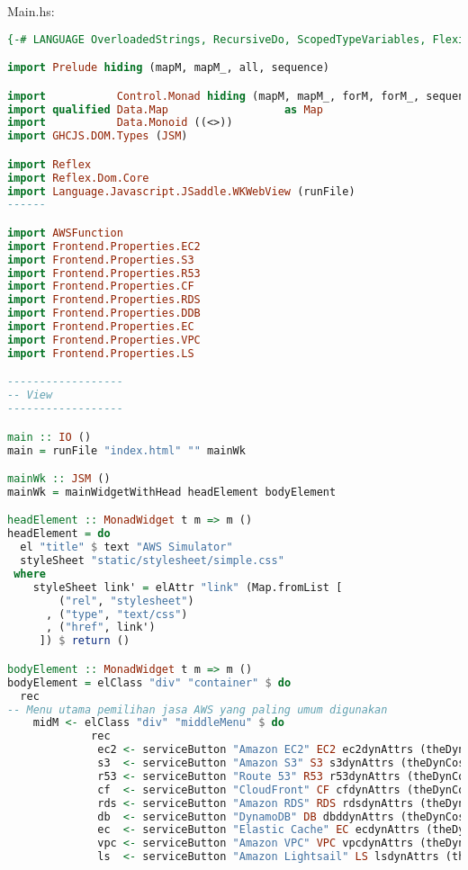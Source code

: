 \documentclass[pi.tex]{subfile}
\begin{document}
Main.hs:
\begin{lstlisting}[language=Haskell]
{-# LANGUAGE OverloadedStrings, RecursiveDo, ScopedTypeVariables, FlexibleContexts, TypeFamilies, ConstraintKinds #-}

import Prelude hiding (mapM, mapM_, all, sequence)

import           Control.Monad hiding (mapM, mapM_, forM, forM_, sequence)
import qualified Data.Map                  as Map
import           Data.Monoid ((<>))
import GHCJS.DOM.Types (JSM)

import Reflex
import Reflex.Dom.Core
import Language.Javascript.JSaddle.WKWebView (runFile)
------

import AWSFunction
import Frontend.Properties.EC2
import Frontend.Properties.S3
import Frontend.Properties.R53
import Frontend.Properties.CF
import Frontend.Properties.RDS
import Frontend.Properties.DDB
import Frontend.Properties.EC
import Frontend.Properties.VPC
import Frontend.Properties.LS

------------------
-- View
------------------

main :: IO ()
main = runFile "index.html" "" mainWk

mainWk :: JSM ()
mainWk = mainWidgetWithHead headElement bodyElement

headElement :: MonadWidget t m => m ()
headElement = do
  el "title" $ text "AWS Simulator"
  styleSheet "static/stylesheet/simple.css"
 where
    styleSheet link' = elAttr "link" (Map.fromList [
        ("rel", "stylesheet")
      , ("type", "text/css")
      , ("href", link')
     ]) $ return ()

bodyElement :: MonadWidget t m => m ()
bodyElement = elClass "div" "container" $ do
  rec
-- Menu utama pemilihan jasa AWS yang paling umum digunakan
    midM <- elClass "div" "middleMenu" $ do
             rec
              ec2 <- serviceButton "Amazon EC2" EC2 ec2dynAttrs (theDynCost rightM 1)
              s3  <- serviceButton "Amazon S3" S3 s3dynAttrs (theDynCost rightM 2)
              r53 <- serviceButton "Route 53" R53 r53dynAttrs (theDynCost rightM 3)
              cf  <- serviceButton "CloudFront" CF cfdynAttrs (theDynCost rightM 4)
              rds <- serviceButton "Amazon RDS" RDS rdsdynAttrs (theDynCost rightM 5)
              db  <- serviceButton "DynamoDB" DB dbddynAttrs (theDynCost rightM 6)
              ec  <- serviceButton "Elastic Cache" EC ecdynAttrs (theDynCost rightM 7)
              vpc <- serviceButton "Amazon VPC" VPC vpcdynAttrs (theDynCost rightM 8)
              ls  <- serviceButton "Amazon Lightsail" LS lsdynAttrs (theDynCost rightM 9)


\end{lstlisting}
\end{document}
